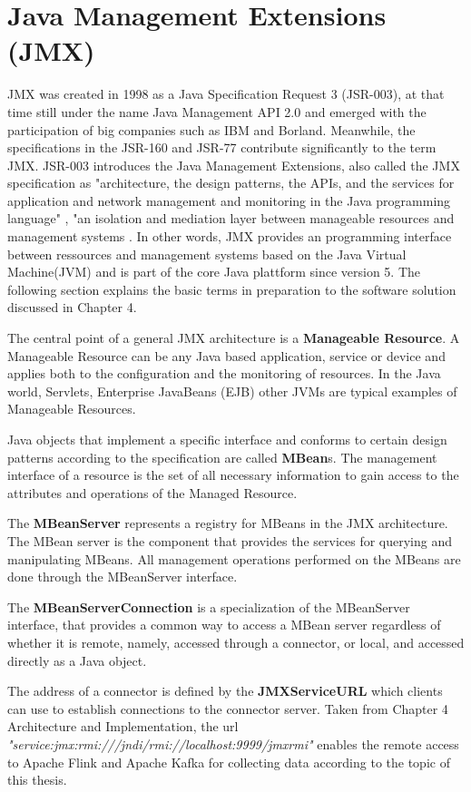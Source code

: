 \section{{Java Management Extensions (JMX)}}

JMX was created in 1998 as a Java Specification Request 3 (JSR-003), at that time still
under the name Java Management API 2.0 and emerged with the participation of big
companies such as IBM and Borland. Meanwhile, the specifications in the JSR-160 and
JSR-77 contribute significantly to the term JMX. JSR-003 introduces the Java Management
Extensions, also called the JMX specification as "architecture, the design patterns,
the APIs, and the services for application and network management and monitoring in
the Java programming language" \cite{Sun13}, "an isolation and mediation layer between manageable
resources and management systems \cite{Kreg03}. In other words, JMX provides an programming interface between ressources
and management systems based on the Java Virtual Machine(JVM) and is part of the core Java plattform since
version 5. The following section explains the basic terms in preparation to the software solution discussed
in Chapter 4.

The central point of a general JMX architecture is a \textbf{Manageable Resource}.
A Manageable Resource can be any Java based application, service or device and
applies both to the configuration and the monitoring of resources. In the Java world,
Servlets, Enterprise JavaBeans (EJB) other JVMs are typical examples of Manageable Resources.

Java objects that implement a specific interface and conforms to certain design patterns according
to the specification are called \textbf{MBean}s. The management interface of a resource is the
set of all necessary information to gain access to the attributes and operations of the Managed Resource.

The \textbf{MBeanServer} represents a registry for MBeans in the JMX architecture. The MBean server is the
component that provides the services for querying and manipulating MBeans. All management operations performed on the
MBeans are done through the MBeanServer interface.

The \textbf{MBeanServerConnection} is a specialization of the MBeanServer interface, that provides a common way to
access a MBean server regardless of whether it is remote, namely, accessed through a connector, or local, and accessed
directly as a Java object.

The address of a connector is defined by the \textbf{JMXServiceURL} which clients can use to establish connections
to the connector server. Taken from Chapter 4 Architecture and Implementation, the url \textit{"service:jmx:rmi:///jndi/rmi://localhost:9999/jmxrmi"}
enables the remote access to Apache Flink and Apache Kafka for collecting data according to the topic of this thesis.


